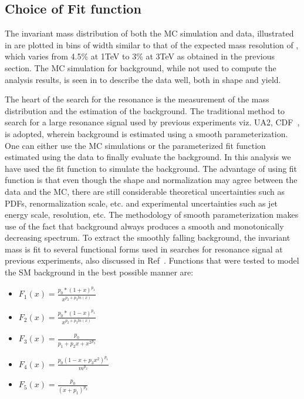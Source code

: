 \subsection{Choice of Fit function}\label{Se:fit}
The invariant mass distribution of both the MC simulation and data, illustrated in \fig{\ref{fig:massVarBin}} are plotted in bins of width
similar to that of the expected mass resolution of \qstar,  which varies from 4.5\% at 1\unit{TeV} to 3\% at 3\unit{TeV} as obtained in the previous
section. The MC simulation for background, while not used to compute the analysis results, is seen in \fig{\ref{fig:massVarBin}} to describe the 
data well, both in shape and yield. 

The heart of the search for the \qstar resonance is the measurement of the \gamjet mass distribution and the estimation of the background.  
The traditional method to search for a large resonance signal used by previous experiments viz. UA2, CDF~\cite{Harris:2011bh}, is adopted,
wherein background is estimated using a smooth parameterization. One can either use the MC simulations or the parameterized fit function estimated
using the data to finally evaluate the background. In this analysis we have used the fit function to simulate the background. The advantage of using fit
function is that even though the shape and normalization may agree between the data and the MC, 
there are still considerable theoretical uncertainties such as PDFs, renormalization scale, etc. and experimental uncertainties such as jet energy 
scale, resolution, etc. The methodology of smooth parameterization makes use of the fact that \gamjet background always produces a smooth and monotonically decreasing 
spectrum. To extract the smoothly falling background, the \gamjet invariant mass is fit to several functional forms used in searches for resonance 
signal at previous experiments, also discussed in Ref~\cite{Harris:2011bh}. Functions that were tested to model the SM background in the best 
possible manner are:
\begin{itemize}
\item  $ F_{1}(x) = \frac{p_{0}\ast(1+x)^{p_{1}}}{x^{p_{2}+p_{3}ln(x)}} $   %
\item  $ F_{2}(x) = \frac{p_{0}\ast(1-x)^{p_{1}}}{x^{p_{2}+p_{3}ln(x)}} $   %
\item  $ F_{3}(x) = \frac{p_{0}}{{p_{1}+p_{2}x+x^{2}}^{p_{3}}} $  %
\item  $ F_{4}(x) = \frac{p_{0}(1-x+p_{3}x^{2})^{p_{1}}}{m^{p_{2}}}   $  %
\item  $ F_{5}(x) = \frac{p_{0}}{(x+p_{1})^{p_{2}}} $  %
\end{itemize}

